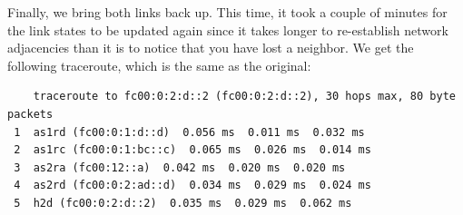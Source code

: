 Finally, we bring both links back up. This time, it took a couple of minutes for the link states to be updated again since it takes longer to re-establish network adjacencies than it is to notice that you have lost a neighbor. We get the following traceroute, which is the same as the original:

\begin{verbatim}
    traceroute to fc00:0:2:d::2 (fc00:0:2:d::2), 30 hops max, 80 byte packets
 1  as1rd (fc00:0:1:d::d)  0.056 ms  0.011 ms  0.032 ms
 2  as1rc (fc00:0:1:bc::c)  0.065 ms  0.026 ms  0.014 ms
 3  as2ra (fc00:12::a)  0.042 ms  0.020 ms  0.020 ms
 4  as2rd (fc00:0:2:ad::d)  0.034 ms  0.029 ms  0.024 ms
 5  h2d (fc00:0:2:d::2)  0.035 ms  0.029 ms  0.062 ms
\end{verbatim}